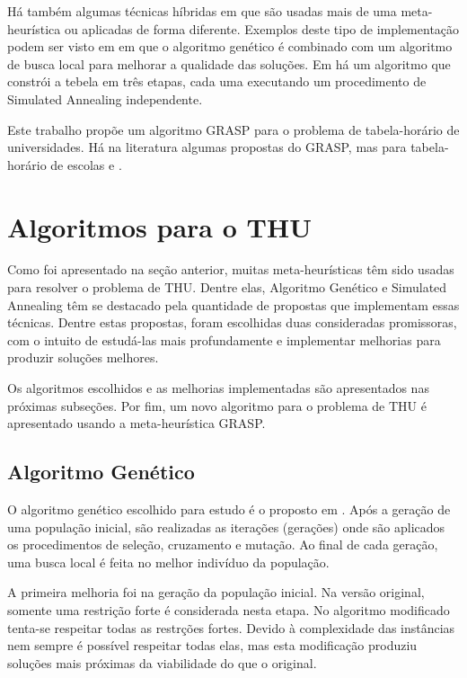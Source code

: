 \documentclass[11pt]{article}
\begin{document}
Há também algumas técnicas híbridas em que são usadas mais de uma meta-heurística ou aplicadas de forma diferente. Exemplos deste tipo de implementação podem ser visto em \cite{massoodian2008} em que o algoritmo genético é combinado com um algoritmo de busca local para melhorar a qualidade das soluções. Em \cite{3-phaseSA} há um algoritmo que constrói a tebela em três etapas, cada uma executando um procedimento de Simulated Annealing independente.

Este trabalho propõe um algoritmo GRASP para o problema de tabela-horário de universidades. Há na literatura algumas propostas do GRASP, mas para tabela-horário de escolas \cite{Souza:2004} e \cite{Vieira_agrasp}.



\section{Algoritmos para o THU}
\label{sec:algoritmos}

Como foi apresentado na seção anterior, muitas meta-heurísticas têm sido usadas para resolver o problema de THU. Dentre elas, Algoritmo Genético e Simulated Annealing têm se destacado pela quantidade de propostas que implementam essas técnicas. Dentre estas propostas, foram escolhidas duas consideradas promissoras, com o intuito de estudá-las mais profundamente e implementar melhorias para produzir soluções melhores.

Os algoritmos escolhidos e as melhorias implementadas são apresentados nas próximas subseções. Por fim, um novo algoritmo para o problema de THU é apresentado usando a meta-heurística GRASP.

\subsection{Algoritmo Genético}

O algoritmo genético escolhido para estudo é o proposto em \cite{massoodian2008}. Após a geração de uma população inicial, são realizadas as iterações (gerações) onde são aplicados os procedimentos de seleção, cruzamento e mutação. Ao final de cada geração, uma busca local é feita no melhor indivíduo da população.

A primeira melhoria foi na geração da população inicial. Na versão original, somente uma restrição forte é considerada nesta etapa. No algoritmo modificado tenta-se respeitar todas as restrções fortes. Devido à complexidade das instâncias nem sempre é possível respeitar todas elas, mas esta modificação produziu soluções mais próximas da viabilidade do que o original.
\end{document}
